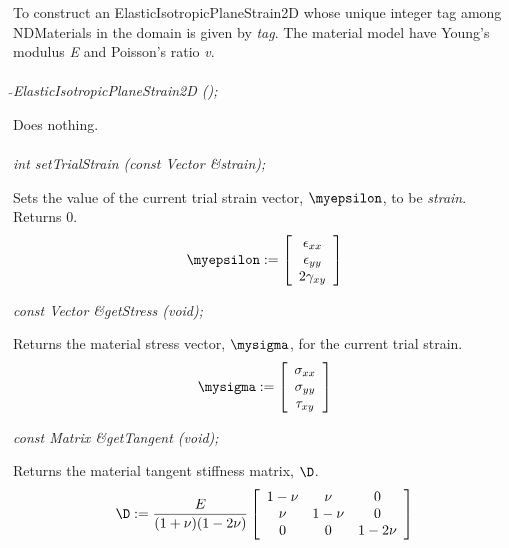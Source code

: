 To construct an ElasticIsotropicPlaneStrain2D whose unique integer tag
among NDMaterials in the domain is given by {\em tag}.  The material
model have Young's modulus {\em E} and Poisson's ratio {\em v}. \\

 \\
{\em $\tilde{ }$ElasticIsotropicPlaneStrain2D ();} 

Does nothing. \\ 

 \\
{\em int setTrialStrain (const Vector \&strain); }  

Sets the value of the current trial strain vector, $\myepsilon$,
to be {\em strain}. Returns $0$. \\

\begin{displaymath}
\myepsilon := \left[
   \begin{array}{c}
       \epsilon_{xx} \\
       \epsilon_{yy}   \\
       2 \gamma_{xy}   
   \end{array} 
 \right]
\end{displaymath}

{\em const Vector \&getStress (void); } 

Returns the material stress vector, $\mysigma$, for the current
trial strain. \\

\begin{displaymath}
\mysigma := \left[
   \begin{array}{c}
       \sigma_{xx} \\
       \sigma_{yy}   \\
       \tau_{xy}   
   \end{array} 
 \right]
\end{displaymath}

{\em const Matrix \&getTangent (void); } 

Returns the material tangent stiffness matrix, $\D$. \\

\begin{displaymath}
\D := \frac{E}{(1+\nu)(1-2\nu)} \left[
   \begin{array}{ccc}
         1-\nu &     \nu &      0 \\
           \nu &   1-\nu &      0 \\
             0 &       0 & 1-2\nu
   \end{array} 
 \right]
\end{displaymath}

